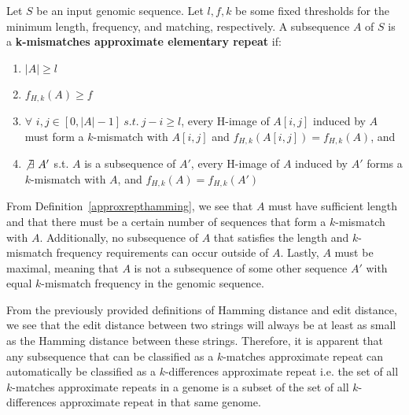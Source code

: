 \begin{defn}
Let $S$ be an input genomic sequence. Let $l, f, k$ be some fixed thresholds for the minimum length, frequency, and matching, respectively. A subsequence $A$ of $S$ is a \textbf{k-mismatches approximate elementary repeat} if:
\begin{enumerate}
\item{$|A| \geq l$} 
\item{$f_{H,k}(A) \geq f$}
\item{$\forall$ $i, j \in [0,|A|-1] \ s.t. \ j-i \geq l$, every H-image of $A[i,j]$ induced by $A$ must form a $k$-mismatch with $A[i,j]$ and $f_{H,k}(A[i,j]) = f_{H,k}(A)$, and}
\item{$\not\exists \ A'$  s.t. $A$ is a subsequence of $A'$, every H-image of $A$ induced by $A'$ forms a $k$-mismatch with $A$, and $f_{H,k}(A) = f_{H,k}(A')$ \cite{zheng2005discovery}}
\end{enumerate}
\label{approxrepthamming}
\end{defn}

From Definition~\ref{approxrepthamming}, we see that $A$ must have sufficient length and that there must be a certain number of sequences that form a $k$-mismatch with $A$. Additionally, no subsequence of $A$ that satisfies the length and $k$-mismatch frequency requirements can occur outside of $A$. Lastly, $A$ must be maximal, meaning that $A$ is not a subsequence of some other sequence $A'$ with equal $k$-mismatch frequency in the genomic sequence.

From the previously provided definitions of Hamming distance and edit distance, we see that the edit distance between two strings will always be at least as small as the Hamming distance between these strings. Therefore, it is apparent that any subsequence that can be classified as a $k$-matches approximate repeat can automatically be classified as a $k$-differences approximate repeat i.e. the set of all $k$-matches approximate repeats in a genome is a subset of the set of all $k$-differences approximate repeat in that same genome.


